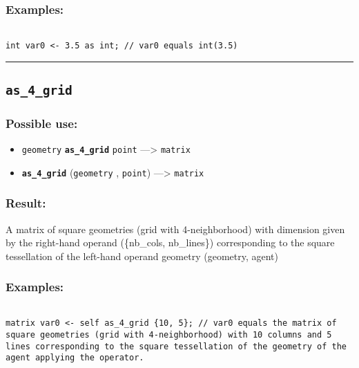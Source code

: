 \documentclass[]{book}
\providecommand{\tightlist}{%
  \setlength{\itemsep}{0pt}\setlength{\parskip}{0pt}}
\theoremstyle{definition}
\theoremstyle{definition}
\theoremstyle{definition}
\theoremstyle{remark}
\begin{document}
\subsubsection{Examples:}\label{examples-35}

\begin{verbatim}
 
int var0 <- 3.5 as int; // var0 equals int(3.5)
\end{verbatim}

\begin{center}\rule{0.5\linewidth}{\linethickness}\end{center}

\subsection{\texorpdfstring{\texttt{as\_4\_grid}}{as\_4\_grid}}\label{as_4_grid}

\subsubsection{Possible use:}\label{possible-use-44}

\begin{itemize}
\tightlist
\item
  \texttt{geometry} \textbf{\texttt{as\_4\_grid}} \texttt{point}
  ---\textgreater{} \texttt{matrix}
\item
  \textbf{\texttt{as\_4\_grid}} (\texttt{geometry} , \texttt{point})
  ---\textgreater{} \texttt{matrix}
\end{itemize}

\subsubsection{Result:}\label{result-43}

A matrix of square geometries (grid with 4-neighborhood) with dimension
given by the right-hand operand (\{nb\_cols, nb\_lines\}) corresponding
to the square tessellation of the left-hand operand geometry (geometry,
agent)

\subsubsection{Examples:}\label{examples-36}

\begin{verbatim}
 
matrix var0 <- self as_4_grid {10, 5}; // var0 equals the matrix of square geometries (grid with 4-neighborhood) with 10 columns and 5 lines corresponding to the square tessellation of the geometry of the agent applying the operator.
\end{verbatim}
\end{document}
